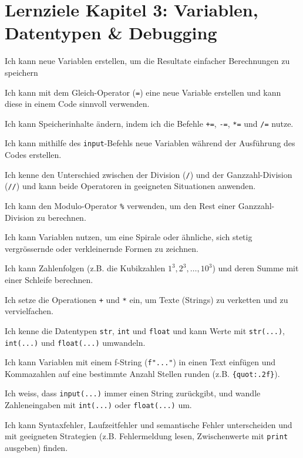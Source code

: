 \section*{Lernziele Kapitel 3: Variablen, Datentypen \& Debugging}
\begin{todolist}
    \item Ich kann neue Variablen erstellen, um die Resultate einfacher Berechnungen zu speichern
    \item Ich kann mit dem Gleich-Operator (\lstinline|=|) eine neue Variable erstellen und kann diese in einem Code sinnvoll verwenden.
    \item Ich kann Speicherinhalte ändern, indem ich die Befehle \lstinline|+=|, \lstinline|-=|, \lstinline|*=| und \lstinline|/=| nutze.
    \item Ich kann mithilfe des \lstinline|input|-Befehls neue Variablen während der Ausführung des Codes erstellen.
    \item Ich kenne den Unterschied zwischen der Division (\lstinline|/|) und der Ganzzahl-Division (\lstinline|//|) und kann beide Operatoren in geeigneten Situationen anwenden.
    \item Ich kann den Modulo-Operator \lstinline|%| verwenden, um den Rest einer Ganzzahl-Division zu berechnen.
    \item Ich kann Variablen nutzen, um eine Spirale oder ähnliche, sich stetig vergrössernde oder verkleinernde Formen zu zeichnen.
    \item Ich kann Zahlenfolgen (z.B. die Kubikzahlen $1^3, 2^3, \ldots, 10^3$) und deren Summe mit einer Schleife berechnen.
    \item Ich setze die Operationen \lstinline|+| und \lstinline|*| ein, um Texte (Strings) zu verketten und zu vervielfachen.
    \item Ich kenne die Datentypen \lstinline|str|, \lstinline|int| und \lstinline|float| und kann Werte mit \lstinline|str(...)|, \lstinline|int(...)| und \lstinline|float(...)| umwandeln.
    \item Ich kann Variablen mit einem f-String (\lstinline|f"..."|) in einen Text einfügen und Kommazahlen auf eine bestimmte Anzahl Stellen runden (z.B. \lstinline|{quot:.2f}|).
    \item Ich weiss, dass \lstinline|input(...)| immer einen String zurückgibt, und wandle Zahleneingaben mit \lstinline|int(...)| oder \lstinline|float(...)| um.
    \item Ich kann Syntaxfehler, Laufzeitfehler und semantische Fehler unterscheiden und mit geeigneten Strategien (z.B. Fehlermeldung lesen, Zwischenwerte mit \lstinline|print| ausgeben) finden.
\end{todolist}

